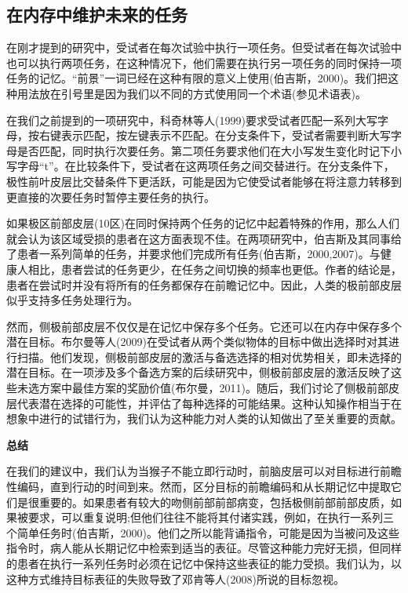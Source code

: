 \subsection{在内存中维护未来的任务}
\par
在刚才提到的研究中，受试者在每次试验中执行一项任务。但受试者在每次试验中也可以执行两项任务，在这种情况下，他们需要在执行另一项任务的同时保持一项任务的记忆。“前景”一词已经在这种有限的意义上使用(伯吉斯，2000)。我们把这种用法放在引号里是因为我们以不同的方式使用同一个术语(参见术语表)。
\par
在我们之前提到的一项研究中，科奇林等人(1999)要求受试者匹配一系列大写字母，按右键表示匹配，按左键表示不匹配。在分支条件下，受试者需要判断大写字母是否匹配，同时执行次要任务。第二项任务要求他们在大小写发生变化时记下小写字母“t”。在比较条件下，受试者在这两项任务之间交替进行。在分支条件下，极性前叶皮层比交替条件下更活跃，可能是因为它使受试者能够在将注意力转移到更直接的次要任务时暂停主要任务的执行。
\par
如果极区前部皮层(10区)在同时保持两个任务的记忆中起着特殊的作用，那么人们就会认为该区域受损的患者在这方面表现不佳。在两项研究中，伯吉斯及其同事给了患者一系列简单的任务，并要求他们完成所有任务(伯吉斯，2000,2007)。与健康人相比，患者尝试的任务更少，在任务之间切换的频率也更低。作者的结论是，患者在尝试时并没有将所有的任务都保存在前瞻记忆中。因此，人类的极前部皮层似乎支持多任务处理行为。
\par
然而，侧极前部皮层不仅仅是在记忆中保存多个任务。它还可以在内存中保存多个潜在目标。布尔曼等人(2009)在受试者从两个类似物体的目标中做出选择时对其进行扫描。他们发现，侧极前部皮层的激活与备选选择的相对优势相关，即未选择的潜在目标。在一项涉及多个备选方案的后续研究中，侧极前部皮层的激活反映了这些未选方案中最佳方案的奖励价值(布尔曼，2011)。随后，我们讨论了侧极前部皮层代表潜在选择的可能性，并评估了每种选择的可能结果。这种认知操作相当于在想象中进行的试错行为，我们认为这种能力对人类的认知做出了至关重要的贡献。
\par
\textbf{总结}
\par
在我们的建议中，我们认为当猴子不能立即行动时，前脑皮层可以对目标进行前瞻性编码，直到行动的时间到来。然而，区分目标的前瞻编码和从长期记忆中提取它们是很重要的。如果患者有较大的吻侧前部前部病变，包括极侧前部前部皮质，如果被要求，可以重复说明;但他们往往不能将其付诸实践，例如，在执行一系列三个简单任务时(伯吉斯，2000)。他们之所以能背诵指令，可能是因为当被问及这些指令时，病人能从长期记忆中检索到适当的表征。尽管这种能力完好无损，但同样的患者在执行一系列任务时必须在记忆中保持这些表征的能力受损。我们认为，以这种方式维持目标表征的失败导致了邓肯等人(2008)所说的目标忽视。
